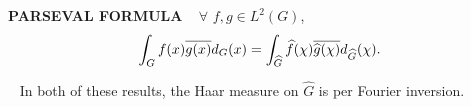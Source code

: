 \vspace{0.1cm}

\begin{x}{\small\bf PARSEVAL FORMULA} \ %
$\forall$ $f, g \in  L^2(G)$,
\[
\int_G f(x) \overline{g(x)} d_G(x) = \int_{\widehat{G}} \widehat{f}(\chi) \overline{\widehat{g}(\chi)} d_{\widehat{G}} (\chi).
\]
\end{x}

\vspace{0.1cm}


\begin{x}{\small\bf {}} \ %
In both of these results, the Haar measure on $\widehat{G}$ is per Fourier inversion.
\end{x}





















